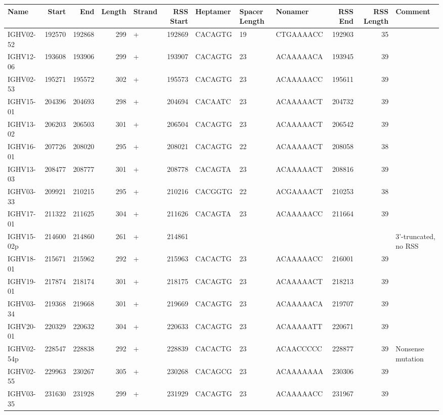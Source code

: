 \begin{tabular}{lrrrlrlllrrp{4cm}}
  \toprule Name & Start & End & Length & Strand & RSS Start & Heptamer & Spacer Length & Nonamer & RSS End & RSS Length & Comment \\ 
  \midrule IGHV02-52 & 192570 & 192868 & 299 & + & 192869 & CACAGTG & 19 & CTGAAAACC & 192903 & 35 &  \\ 
  IGHV12-06 & 193608 & 193906 & 299 & + & 193907 & CACAGTG & 23 & ACAAAAACA & 193945 & 39 &  \\ 
  IGHV02-53 & 195271 & 195572 & 302 & + & 195573 & CACAGTG & 23 & ACAAAAACC & 195611 & 39 &  \\ 
  IGHV15-01 & 204396 & 204693 & 298 & + & 204694 & CACAATC & 23 & ACAAAAACT & 204732 & 39 &  \\ 
  IGHV13-02 & 206203 & 206503 & 301 & + & 206504 & CACAGTG & 23 & ACAAAAACT & 206542 & 39 &  \\ 
  IGHV16-01 & 207726 & 208020 & 295 & + & 208021 & CACAGTG & 22 & ACAAAAACT & 208058 & 38 &  \\ 
  IGHV13-03 & 208477 & 208777 & 301 & + & 208778 & CACAGTA & 23 & ACAAAAACT & 208816 & 39 &  \\ 
  IGHV03-33 & 209921 & 210215 & 295 & + & 210216 & CACGGTG & 22 & ACGAAAACT & 210253 & 38 &  \\ 
  IGHV17-01 & 211322 & 211625 & 304 & + & 211626 & CACAGTA & 23 & ACAAAAACC & 211664 & 39 &  \\ 
  IGHV15-02p & 214600 & 214860 & 261 & + & 214861 &  &  &  &  &  & 3'-truncated, no RSS \\ 
  IGHV18-01 & 215671 & 215962 & 292 & + & 215963 & CACACTG & 23 & ACAAAAACC & 216001 & 39 &  \\ 
  IGHV19-01 & 217874 & 218174 & 301 & + & 218175 & CACAGTG & 23 & ACAAAAACT & 218213 & 39 &  \\ 
  IGHV03-34 & 219368 & 219668 & 301 & + & 219669 & CACAGTG & 23 & ACAAAAACA & 219707 & 39 &  \\ 
  IGHV20-01 & 220329 & 220632 & 304 & + & 220633 & CACAGTG & 23 & ACAAAAATT & 220671 & 39 &  \\ 
  IGHV02-54p & 228547 & 228838 & 292 & + & 228839 & CACACTG & 23 & ACAACCCCC & 228877 & 39 & Nonsense mutation \\ 
  IGHV02-55 & 229963 & 230267 & 305 & + & 230268 & CACAGCG & 23 & ACAAAAAAA & 230306 & 39 &  \\ 
  IGHV03-35 & 231630 & 231928 & 299 & + & 231929 & CACAGTG & 23 & ACAAAAACC & 231967 & 39 &  \\ 

\end{tabular}
